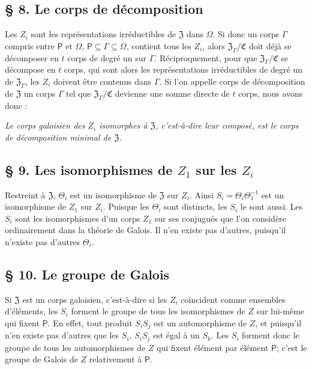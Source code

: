 \subsection*{\S{} 8. Le corps de décomposition}\label{der-zerfaellungskoerper}

Les \(Z_i\) sont les représentations irréductibles de \(\mathfrak Z\) dans \(\Omega\). Si donc un corps \(\Gamma\) compris entre \(\mathsf P\) et \(\Omega\), \(\mathsf P\subseteq\Gamma\subseteq\Omega\), contient tous les \(Z_i\), alors \(\mathfrak Z_\Gamma/\mathfrak C\) doit déjà se décomposer en \(t\) corps de degré un sur \(\Gamma\). Réciproquement, pour que \(\mathfrak Z_\Gamma/\mathfrak C\) se décompose en \(t\) corps, qui sont alors les représentations irréductibles de degré un de \(\mathfrak Z_\Gamma\), les \(Z_i\) doivent être contenus dans \(\Gamma\). Si l'on appelle corps de décomposition de \(\mathfrak Z\) un corps \(\Gamma\) tel que \(\mathfrak Z_\Gamma/\mathfrak C\) devienne une somme directe de \(t\) corps, nous avons donc :

\emph{Le corps galoisien des \(Z_i\) isomorphes à \(\mathfrak Z\), c'est-à-dire leur composé, est le corps de décomposition minimal de \(\mathfrak Z\).}

\subsection*{\S{} 9. Les isomorphismes de \(Z_1\) sur les \(Z_i\)}\label{die-isomorphismen-von-z1-auf-die-zi}

Restreint à \(\mathfrak Z\), \(\Theta_i\) est un isomorphisme de \(\mathfrak Z\) sur \(Z_i\). Ainsi \(S_i=\Theta_i\Theta_1^{-1}\) est un isomorphisme de \(Z_1\) sur \(Z_i\). Puisque les \(\Theta_i\) sont distincts, les \(S_i\) le sont aussi. Les \(S_i\) sont les isomorphismes d'un corps \(Z_1\) sur ses conjugués que l'on considère ordinairement dans la théorie de Galois. Il n'en existe pas d'autres, puisqu'il n'existe pas d'autres \(\Theta_i\).

\subsection*{\S{} 10. Le groupe de Galois}\label{die-galoissche-gruppe}

Si \(\mathfrak Z\) est un corps galoisien, c'est-à-dire si les \(Z_i\) coïncident comme ensembles d'éléments, les \(S_i\) forment le groupe de tous les isomorphismes de \(Z\) sur lui-même qui fixent \(\mathsf P\). En effet, tout produit \(S_iS_j\) est un automorphisme de \(Z\), et puisqu'il n'en existe pas d'autres que les \(S_i\), \(S_iS_j\) est égal à un \(S_k\). Les \(S_i\) forment donc le groupe de tous les automorphismes de \(Z\) qui fixent élément par élément \(\mathsf P\); c'est le groupe de Galois de \(Z\) relativement à \(\mathsf P\).

